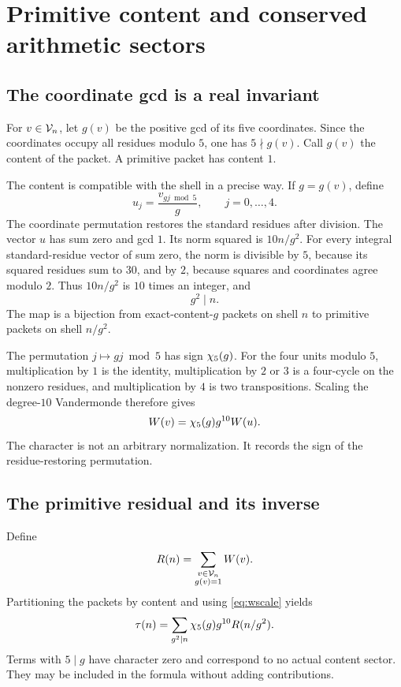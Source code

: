 \chapter{Primitive content and conserved arithmetic sectors}\label{ch:content}
\section{The coordinate gcd is a real invariant}
For $v\in\mathcal V_n$, let $g(v)$ be the positive gcd of its five coordinates. Since the coordinates occupy all residues modulo $5$, one has $5\nmid g(v)$. Call $g(v)$ the content of the packet. A primitive packet has content $1$.

The content is compatible with the shell in a precise way. If $g=g(v)$, define
\begin{equation}\label{eq:contentscale}
u_j=\frac{v_{gj\bmod5}}g,\qquad j=0,\ldots,4.
\end{equation}
The coordinate permutation restores the standard residues after division. The vector $u$ has sum zero and gcd $1$. Its norm squared is $10n/g^2$. For every integral standard-residue vector of sum zero, the norm is divisible by $5$, because its squared residues sum to $30$, and by $2$, because squares and coordinates agree modulo $2$. Thus $10n/g^2$ is $10$ times an integer, and
\[
g^2\mid n.
\]
The map is a bijection from exact-content-$g$ packets on shell $n$ to primitive packets on shell $n/g^2$.

The permutation $j\mapsto gj\bmod5$ has sign $\chi_5(g)$. For the four units modulo $5$, multiplication by $1$ is the identity, multiplication by $2$ or $3$ is a four-cycle on the nonzero residues, and multiplication by $4$ is two transpositions. Scaling the degree-$10$ Vandermonde therefore gives
\begin{equation}\label{eq:wscale}
W(v)=\chi_5(g)g^{10}W(u).
\end{equation}
The character is not an arbitrary normalization. It records the sign of the residue-restoring permutation.

\section{The primitive residual and its inverse}
Define
\begin{equation}\label{eq:residualdef}
R(n)=\sum_{\substack{v\in\mathcal V_n\\g(v)=1}}W(v).
\end{equation}
Partitioning the packets by content and using \eqref{eq:wscale} yields
\begin{equation}\label{eq:contentdecomposition}
\tau(n)=\sum_{g^2\mid n}\chi_5(g)g^{10}R(n/g^2).
\end{equation}
Terms with $5\mid g$ have character zero and correspond to no actual content sector. They may be included in the formula without adding contributions.

